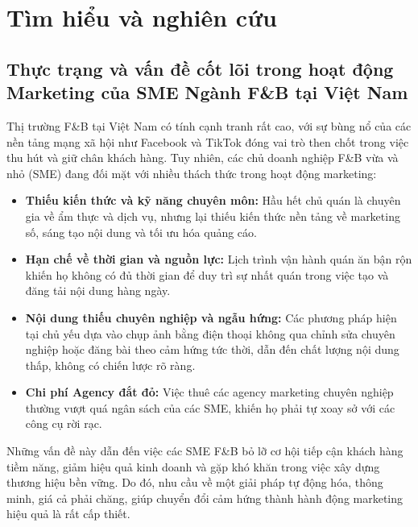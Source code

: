 \section{Tìm hiểu và nghiên
cứu}\label{tuxecm-hiux1ec3u-vuxe0-nghiuxean-cux1ee9u}

\subsection{Thực trạng và vấn đề cốt lõi trong hoạt động Marketing của
SME Ngành F\&B tại Việt
Nam}\label{thux1ef1c-trux1ea1ng-vuxe0-vux1ea5n-ux111ux1ec1-cux1ed1t-luxf5i-trong-houx1ea1t-ux111ux1ed9ng-marketing-cux1ee7a-sme-nguxe0nh-fb-tux1ea1i-viux1ec7t-nam}

Thị trường F\&B tại Việt Nam có tính cạnh tranh rất cao, với sự bùng nổ
của các nền tảng mạng xã hội như Facebook và TikTok đóng vai trò then
chốt trong việc thu hút và giữ chân khách hàng. Tuy nhiên, các chủ doanh
nghiệp F\&B vừa và nhỏ (SME) đang đối mặt với nhiều thách thức trong
hoạt động marketing:

\begin{itemize}
\item
  \textbf{Thiếu kiến thức và kỹ năng chuyên môn:} Hầu hết chủ quán là
  chuyên gia về ẩm thực và dịch vụ, nhưng lại thiếu kiến thức nền tảng
  về marketing số, sáng tạo nội dung và tối ưu hóa quảng cáo.
\item
  \textbf{Hạn chế về thời gian và nguồn lực:} Lịch trình vận hành quán
  ăn bận rộn khiến họ không có đủ thời gian để duy trì sự nhất quán
  trong việc tạo và đăng tải nội dung hàng ngày.
\item
  \textbf{Nội dung thiếu chuyên nghiệp và ngẫu hứng:} Các phương pháp
  hiện tại chủ yếu dựa vào chụp ảnh bằng điện thoại không qua chỉnh sửa
  chuyên nghiệp hoặc đăng bài theo cảm hứng tức thời, dẫn đến chất lượng
  nội dung thấp, không có chiến lược rõ ràng.
\item
  \textbf{Chi phí Agency đắt đỏ:} Việc thuê các agency marketing chuyên
  nghiệp thường vượt quá ngân sách của các SME, khiến họ phải tự xoay sở
  với các công cụ rời rạc.
\end{itemize}

Những vấn đề này dẫn đến việc các SME F\&B bỏ lỡ cơ hội tiếp cận khách
hàng tiềm năng, giảm hiệu quả kinh doanh và gặp khó khăn trong việc xây
dựng thương hiệu bền vững. Do đó, nhu cầu về một giải pháp tự động hóa,
thông minh, giá cả phải chăng, giúp chuyển đổi cảm hứng thành hành động
marketing hiệu quả là rất cấp thiết.

